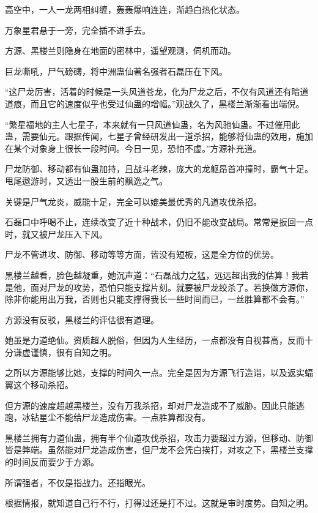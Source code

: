 
\begin{this_body}

高空中，一人一龙两相纠缠，轰轰爆响连连，渐趋白热化状态。

万象星君悬于一旁，完全插不进手去。

方源、黑楼兰则隐身在地面的密林中，遥望观测，伺机而动。

巨龙嘶吼，尸气磅礴，将中洲蛊仙著名强者石磊压在下风。

“这尸龙厉害，活着的时候是一头风道苍龙，化为尸龙之后，不仅有风道还有暗道道痕，而且它的速度似乎也受过仙蛊的增幅。”观战久了，黑楼兰渐渐看出端倪。

“繁星福地的主人七星子，本来就有一只风道仙蛊，名为风驰仙蛊。不过催用此蛊，需要仙元。跟据传闻，七星子曾经研发出一道杀招，能够将仙蛊的效用，施加在某个对象身上很长一段时间。今日一见，恐怕不虚。”方源补充道。

尸龙防御、移动都有仙蛊加持，且战斗老辣，庞大的龙躯昂首冲撞时，霸气十足。甩尾遨游时，又透出一股生前的飘逸之气。

关键是尸气龙炎，威能十足，完全可以媲美最优秀的凡道攻伐杀招。

石磊口中呼喝不止，连续改变了近十种战术，仍旧不能改变战局。常常是扳回一点时，就又被尸龙压入下风。

尸龙不管进攻、防御、移动等等方面，皆没有短板，这是全方位的优势。

黑楼兰越看，脸色越凝重，她沉声道：“石磊战力之猛，远远超出我的估算！我若是他，面对尸龙的攻势，恐怕只能支撑片刻。就要被尸龙绞杀了。若换做方源你，除非你能用出万我，否则也只能支撑得我长一些时间而已，一丝胜算都不会有。”

方源没有反驳，黑楼兰的评估很有道理。

她虽是力道绝仙。资质超人脱俗，但因为人生经历，一点都没有自视甚高，反而十分谦虚谨慎，很有自知之明。

之所以方源能够比她，支撑的时间久一点。完全是因为方源飞行造诣，以及返实蝠翼这个移动杀招。

但方源的速度超越黑楼兰，没有万我杀招，却对尸龙造成不了威胁。因此只能逃跑，冰钻星尘不能给尸龙造成伤害。一点胜算都没有。

黑楼兰拥有力道仙蛊，拥有半个仙道攻伐杀招，攻击力要超过方源，但移动、防御皆是弊端。虽然能对尸龙造成伤害，但尸龙不会凭白挨打，对攻之下，黑楼兰支撑的时间反而要少于方源。

所谓强者，不仅是指战力。还指眼光。

根据情报，就知道自己行不行，打得过还是打不过。这就是审时度势。自知之明。


\end{this_body}
